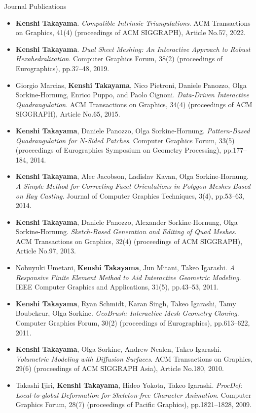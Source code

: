 {\Large\sc Journal Publications}
\vspace{-3mm}
\begin{itemize}
\item {\bf Kenshi Takayama}. {\it Compatible Intrinsic Triangulations}. ACM Transactions on Graphics, 41(4) (proceedings of ACM SIGGRAPH), Article No.57, 2022.
\item {\bf Kenshi Takayama}. {\it Dual Sheet Meshing: An Interactive Approach to Robust Hexahedralization}. Computer Graphics Forum, 38(2) (proceedings of Eurographics), pp.37--48, 2019.
\item Giorgio Marcias, {\bf Kenshi Takayama}, Nico Pietroni, Daniele Panozzo, Olga Sorkine-Hornung, Enrico Puppo, and Paolo Cignoni. {\it Data-Driven Interactive Quadrangulation}. ACM Transactions on Graphics, 34(4) (proceedings of ACM SIGGRAPH), Article No.65, 2015.
\item {\bf Kenshi Takayama}, Daniele Panozzo, Olga Sorkine-Hornung. {\it Pattern-Based Quadrangulation for $N$-Sided Patches}. Computer Graphics Forum, 33(5) (proceedings of Eurographics Symposium on Geometry Processing), pp.177--184, 2014.
\item {\bf Kenshi Takayama}, Alec Jacobson, Ladislav Kavan, Olga Sorkine-Hornung. {\it A Simple Method for Correcting Facet Orientations in Polygon Meshes Based on Ray Casting}. Journal of Computer Graphics Techniques, 3(4), pp.53--63, 2014.
\item {\bf Kenshi Takayama}, Daniele Panozzo, Alexander Sorkine-Hornung, Olga Sorkine-Hornung. {\it Sketch-Based Generation and Editing of Quad Meshes}. ACM Transactions on Graphics, 32(4) (proceedings of ACM SIGGRAPH), Article No.97, 2013.
\item Nobuyuki Umetani, {\bf Kenshi Takayama}, Jun Mitani, Takeo Igarashi. {\it A Responsive Finite Element Method to Aid Interactive Geometric Modeling}. IEEE Computer Graphics and Applications, 31(5), pp.43--53, 2011.
\item {\bf Kenshi Takayama}, Ryan Schmidt, Karan Singh, Takeo Igarashi, Tamy Boubekeur, Olga Sorkine. {\it GeoBrush: Interactive Mesh Geometry Cloning}. Computer Graphics Forum, 30(2) (proceedings of Eurographics), pp.613--622, 2011.
\item {\bf Kenshi Takayama}, Olga Sorkine, Andrew Nealen, Takeo Igarashi. {\it Volumetric Modeling with Diffusion Surfaces}. ACM Transactions on Graphics, 29(6) (proceedings of ACM SIGGRAPH Asia), Article No.180, 2010.
\item Takashi Ijiri, {\bf Kenshi Takayama}, Hideo Yokota, Takeo Igarashi. {\it ProcDef: Local-to-global Deformation for Skeleton-free Character Animation}. Computer Graphics Forum, 28(7) (proceedings of Pacific Graphics), pp.1821--1828, 2009.

\end{itemize}
